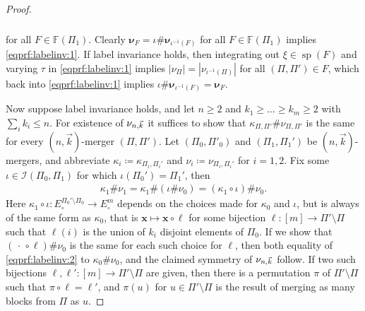 \documentclass[reqno,draft]{amsart}
\numberwithin{equation}{section}
\theoremstyle{plain}
\theoremstyle{remark}
\newcommand{\fpart}{\Pi} %
\DeclareMathOperator{\dcs}{sp}
\newcommand{\nut}[1]{|\nu_{#1}|}
\newcommand{\labelinv}{\mathcal{I}} %
\newcommand{\nunk}{\nu_{n,\smash{\vec{k}}}}
\begin{document}
\begin{proof}
\begin{align}
\begin{split}
    \end{split}\end{align}
    for all $F\in \mathbb{F}(\fpart_1)$. Clearly $\boldsymbol \nu_F = \iota \# \boldsymbol \nu_{\iota^{-1}(F)}$ for all $F\in \mathbb{F}(\fpart_1)$ implies \cref{eqprf:labelinv:1}. If label invariance holds,
    then integrating out $\xi \in \dcs(F)$ and varying $\tau$ in \cref{eqprf:labelinv:1} implies $\nut{\fpart} = \nut{\iota^{-1}(\fpart)}$ for all $(\fpart,\fpart') \in F$, which back into \cref{eqprf:labelinv:1} implies $\iota\# \boldsymbol \nu_{\iota^{-1}(F)} = \boldsymbol \nu_F$.

    Now suppose label invariance holds, and let $n\ge 2$ and $k_1\ge\ldots \ge k_m \ge 2$ with $\sum_i k_i \le n$. For existence of $\nunk$ it suffices to show that $\kappa_{\fpart,\fpart'}\#\nu_{\fpart,\fpart'}$ is the same for every $(n,\vec{k})$-merger $(\fpart,\fpart')$. Let $(\fpart_0,\fpart'_0)$ and $(\fpart_1,\fpart_1')$ be $(n,\vec{k})$-mergers, and abbreviate $\kappa_i \coloneqq \kappa_{\fpart_i,\fpart_i'}$ and $\nu_i \coloneqq \nu_{\fpart_i,\fpart_i'}$ for $i=1,2$. Fix some $\iota\in \labelinv(\fpart_0, \fpart_1)$ for which $\iota(\fpart_0') = \fpart_1'$, then
    \begin{align}\label{eqprf:labelinv:2}
        \kappa_1\# \nu_1
        = \kappa_1 \# (\iota \# \nu_0)
        = (\kappa_1 \circ \iota) \# \nu_0.
    \end{align}
    Here $\kappa_1\circ \iota\colon E^{\fpart_0'\setminus \fpart_0}_\circ  \to E^m_\circ $ depends on the choices made for $\kappa_0$ and $\iota$, but is always of the same form as $\kappa_0$, that is $\boldsymbol x \mapsto \boldsymbol x \circ \ell$ for some bijection $\ell\colon [m] \to \fpart'\setminus \fpart$ such that $\ell(i)$ is the union of $k_i$ disjoint elements of $\fpart_0$. If we show that $(\,\cdot \, \circ \ell)\# \nu_0$ is the same for each such choice for $\ell$, then both equality of \cref{eqprf:labelinv:2} to  $\kappa_0\#\nu_0$, and the claimed symmetry of $\nunk$ follow. If two such bijections $\ell,\ell'\colon [m] \to \fpart'\setminus \fpart$ are given, then there is a permutation $\pi$ of $\fpart'\setminus \fpart$ such that $\pi \circ \ell = \ell'$, and $\pi(u)$ for $u\in \fpart'\setminus \fpart$ is the result of merging as many blocks from $\fpart$ as $u$. %

\end{proof}
\end{document}
